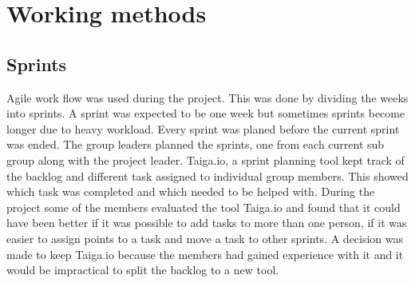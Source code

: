 \chapter{Working methods}
\section{Sprints} 
Agile work flow was used during the project. This was done by dividing the weeks into sprints. A sprint was expected to be one week but sometimes sprints become longer due to heavy workload. Every sprint was planed before the current sprint was ended. The group leaders planned the sprints, one from each current sub group along with the project leader. Taiga.io, a sprint planning tool kept track of the backlog and different task assigned to individual group members. This showed which task was completed and which needed to be helped with. During the project some of the members evaluated the tool Taiga.io and found that it could have been better if it was possible to add tasks to more than one person, if it was easier to assign points to a task and move a task to other sprints. A decision was made to keep Taiga.io because the members had gained experience with it and it would be impractical to split the backlog to a new tool.

